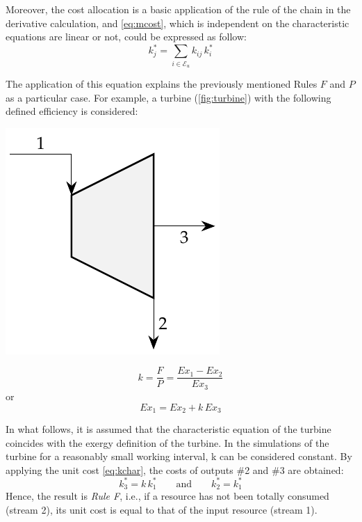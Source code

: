 \documentclass[energies,article,submit,moreauthors,pdftex]{Definitions/mdpi}
\begin{document}
Moreover, the cost allocation is a basic application of the rule of the chain in the derivative calculation, and \cref{eq:mcost}, which is independent on the characteristic equations are linear or not, could be expressed as follow:
\begin{equation}
k_{j}^{*}=\sum_{i\in\mathcal{E}_u}{k_{ij}\,k_{i}^{*}}
\label{eq:kchar}
\end{equation}

The application of this equation explains the previously mentioned Rules $F$ and $P$ as a particular case. For example, a turbine (\cref{fig:turbine}) with the following defined efficiency is considered: 
\begin{center}
  \begin{minipage}[c]{0.50\linewidth}
   \centering
    \includegraphics[scale=0.7]{turbine}
  \end{minipage}
  \begin{minipage}[c]{0.48\linewidth}
    \centering
    \begin{equation*}
        k=\frac{F}{P}=\frac{Ex_1 - Ex_2}{Ex_3}
        \label{eq:turb}
    \end{equation*}
    or
    \begin{equation*}
        Ex_1=Ex_2+k\,Ex_3
    \end{equation*}
  \end{minipage}
  \label{fig:turbine}
\end{center}

In what follows, it is assumed that the characteristic equation of the turbine coincides with the exergy definition of the turbine. In the simulations of the turbine for a reasonably small working interval, k can be considered constant. By applying the unit cost \cref{eq:kchar}, the costs of outputs \#2 and \#3 are obtained:
\begin{equation}
    k_3^*=k\,k_1^* \qquad\text{and}\qquad k_2^*=k_1^*
\end{equation}
Hence, the result is \emph{Rule F}, i.e., if a resource has not been totally consumed (stream 2), its unit cost is equal to that of the input resource (stream 1).                    
\end{document}
